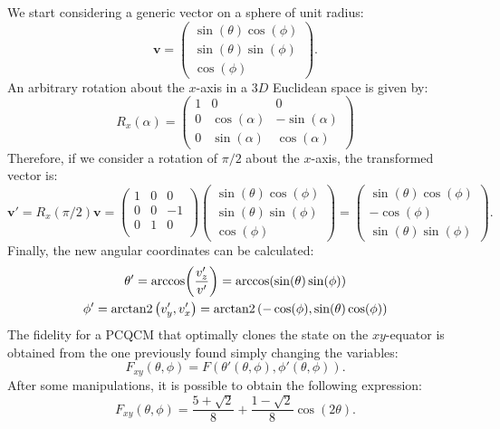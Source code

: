 We start considering a generic vector on a sphere of unit radius:
\[
    \bm v = \begin{pmatrix}
        \sin(\theta)\cos(\phi)\\
        \sin(\theta)\sin(\phi)\\
        \cos(\phi)
    \end{pmatrix}.
\]
An arbitrary rotation about the $x$-axis in a $3D$ Euclidean space is given by:
\[
    R_x(\alpha)=\begin{pmatrix}
        1 & 0 & 0 \\
        0 & \cos(\alpha) & -\sin(\alpha) \\
        0 & \sin(\alpha) & \cos(\alpha)
    \end{pmatrix}
\]
Therefore, if we consider a rotation of $\pi/2$ about the $x$-axis, the transformed vector is:
\[
    \bm v' = R_x(\pi/2)\bm v = \begin{pmatrix}
        1 & 0 & 0 \\
        0 & 0 & -1 \\
        0 & 1 & 0 \\
    \end{pmatrix}
    \begin{pmatrix}
        \sin(\theta)\cos(\phi)\\
        \sin(\theta)\sin(\phi)\\
        \cos(\phi)
    \end{pmatrix}=\begin{pmatrix}
        \sin(\theta)\cos(\phi)\\
        -\cos(\phi)\\
        \sin(\theta)\sin(\phi)
    \end{pmatrix}.
\]
Finally, the new angular coordinates can be calculated:
\[
    \begin{gathered}
    \theta'=\arccos(\frac{v'_z}{v'})=\arccos(\sin(\theta)\sin(\phi))\\
    \phi'=\operatorname{arctan2}\left(v'_y,v'_x\right)=\operatorname{arctan2}\left(-\cos(\phi),\sin(\theta)\cos(\phi)\right)
    \end{gathered}
\]
The fidelity for a PCQCM that optimally clones the state on the $xy$-equator is obtained from the one previously found simply changing the variables:
\[
    F_{xy}(\theta,\phi)=F(\theta'(\theta,\phi),\phi'(\theta,\phi)).
\]
After some manipulations, it is possible to obtain the following expression:
\begin{equation}
    F_{xy}(\theta,\phi)=\frac{5+\sqrt{2}}{8}+\frac{1-\sqrt{2}}{8}\cos(2\theta).
\end{equation}

